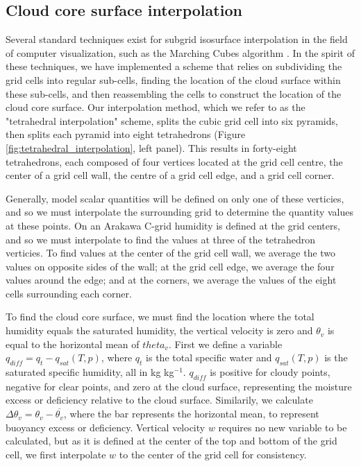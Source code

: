 \documentclass[12pt]{article}
\begin{document}

\subsection{Cloud core surface interpolation}

Several standard techniques exist for subgrid isosurface interpolation in the 
field of computer visualization, such as the Marching Cubes algorithm 
\citep{Lorensen1987}.  In the spirit of these techniques, we have implemented 
a scheme that relies on subdividing the grid cells into regular sub-cells, 
finding the location of the cloud surface within these sub-cells, and then 
reassembling the cells to construct the location of the cloud core surface.
Our interpolation method, which we refer to as the "tetrahedral interpolation"
scheme, splits the cubic grid cell into six pyramids, then splits each pyramid 
into eight tetrahedrons (Figure \ref{fig:tetrahedral_interpolation}, left 
panel).  This results in forty-eight tetrahedrons, each composed of four 
vertices located at the grid cell centre, the center of a grid cell wall, the 
centre of a grid cell edge, and a grid cell corner.

Generally, model scalar quantities will be defined on only one of these 
verticies, and so we must interpolate the surrounding grid to determine the 
quantity values at these points.  On an Arakawa C-grid humidity is defined 
at the grid centers, and so we must interpolate to find the values at three 
of the tetrahedron verticies.  To find values at the center of the grid cell 
wall, we average the two values on opposite sides of the wall; at the grid 
cell edge, we average the four values around the edge; and at the corners, 
we average the values of the eight cells surrounding each corner.

To find the cloud core surface, we must find the location where the total 
humidity equals the saturated humidity, the vertical velocity is zero and 
$\theta_v$ is equal to the horizontal mean of $theta_v$.  First we define a 
variable $q_{diff} = q_t - q_{sat}(T, p)$, where $q_t$ is the total specific 
water and $q_{sat}(T, p)$ is the saturated specific humidity, all in kg 
kg$^{-1}$.  $q_{diff}$ is positive for cloudy points, negative for clear 
points, and zero at the cloud surface, representing the moisture excess or 
deficiency relative to the cloud surface.  Similarily, we calculate $\Delta 
\theta_v = \theta_v - \overline{\theta_v}$, where the bar represents the 
horizontal mean, to represent buoyancy excess or deficiency.  Vertical 
velocity $w$ requires no new variable to be calculated, but as it is defined 
at the center of the top and bottom of the grid cell, we first interpolate 
$w$ to the center of the grid cell for consistency.
\end{document}
